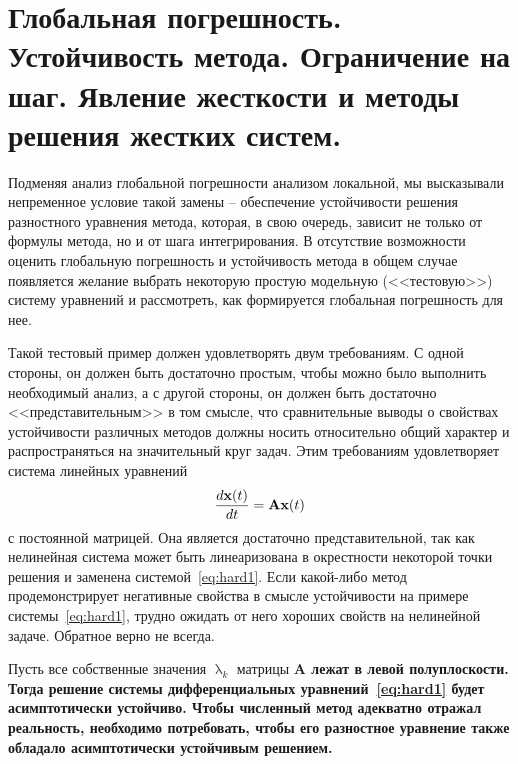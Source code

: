 \section{Глобальная погрешность. Устойчивость метода. Ограничение на шаг. Явление жесткости и методы решения жестких систем.}\label{sec:ch27}
Подменяя анализ глобальной погрешности анализом локальной, мы высказывали непременное условие такой замены --
обеспечение устойчивости решения разностного уравнения метода, которая, в свою очередь, зависит не только от формулы
метода, но и от шага интегрирования. В отсутствие возможности оценить глобальную погрешность и устойчивость метода
в общем случае появляется желание выбрать некоторую простую модельную (<<тестовую>>) систему уравнений и рассмотреть,
как формируется глобальная погрешность для нее.

Такой тестовый пример должен удовлетворять двум требованиям. С одной стороны, он должен быть достаточно простым,
чтобы можно было выполнить необходимый анализ, а с другой стороны, он должен быть достаточно <<представительным>> в
том смысле, что сравнительные выводы о свойствах устойчивости различных методов должны носить относительно общий
характер и распространяться на значительный круг задач. Этим требованиям удовлетворяет система линейных уравнений
\begin{equation}
    \frac{d\bf{x}(t)}{dt} = \bf{A}\bf{x}(t) \label{eq:hard1}
\end{equation}
с постоянной матрицей. Она является достаточно представительной, так как нелинейная система может быть линеаризована
в окрестности некоторой точки решения и заменена системой~\eqref{eq:hard1}. Если какой-либо метод продемонстрирует
негативные свойства в смысле устойчивости на примере системы~\eqref{eq:hard1}, трудно ожидать от него хороших свойств
на нелинейной задаче. Обратное верно не всегда.

Пусть все собственные значения $\uplambda_k$ матрицы \bf{A} лежат в левой полуплоскости. Тогда решение системы
дифференциальных уравнений~\eqref{eq:hard1} будет асимптотически устойчиво. Чтобы численный метод адекватно отражал
реальность, необходимо потребовать, чтобы его разностное уравнение также обладало асимптотически устойчивым решением.

